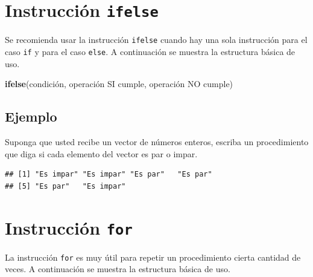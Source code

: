 \documentclass[10pt,]{krantz}
\makeatletter
\newenvironment{Shaded}{\begin{snugshade}}{\end{snugshade}}
\newcommand{\KeywordTok}[1]{\textcolor[rgb]{0.13,0.29,0.53}{\textbf{{#1}}}}
\newcommand{\DecValTok}[1]{\textcolor[rgb]{0.00,0.00,0.81}{{#1}}}
\newcommand{\StringTok}[1]{\textcolor[rgb]{0.31,0.60,0.02}{{#1}}}
\newcommand{\NormalTok}[1]{{#1}}
\newenvironment{kframe}{%
\medskip{}
\setlength{\fboxsep}{.8em}
 \def\at@end@of@kframe{}%
 \ifinner\ifhmode%
  \def\at@end@of@kframe{\end{minipage}}%
  \begin{minipage}{\columnwidth}%
 \fi\fi%
 \def\FrameCommand##1{\hskip\@totalleftmargin \hskip-\fboxsep
 \colorbox{shadecolor}{##1}\hskip-\fboxsep
     \hskip-\linewidth \hskip-\@totalleftmargin \hskip\columnwidth}%
 \MakeFramed {\advance\hsize-\width
   \@totalleftmargin\z@ \linewidth\hsize
   \@setminipage}}%
 {\par\unskip\endMakeFramed%
 \at@end@of@kframe}
\renewenvironment{Shaded}{\begin{kframe}}{\end{kframe}}
\makeatother
\begin{document}
\section{\texorpdfstring{Instrucción \texttt{ifelse}
}{Instrucción ifelse }}\label{instruccion-ifelse}

Se recomienda usar la instrucción \texttt{ifelse} cuando hay una sola
instrucción para el caso \texttt{if} y para el caso \texttt{else}. A
continuación se muestra la estructura básica de uso.

\begin{Shaded}
\begin{Highlighting}[]
\KeywordTok{ifelse}\NormalTok{(condición, operación SI cumple, operación NO cumple)}
\end{Highlighting}
\end{Shaded}

\subsection*{Ejemplo}\label{ejemplo-16}


Suponga que usted recibe un vector de números enteros, escriba un
procedimiento que diga si cada elemento del vector es par o impar.

\begin{Shaded}
\end{Shaded}

\begin{verbatim}
## [1] "Es impar" "Es impar" "Es par"   "Es par"  
## [5] "Es par"   "Es impar"
\end{verbatim}

\section{\texorpdfstring{Instrucción \texttt{for}
}{Instrucción for }}\label{instruccion-for}

La instrucción \texttt{for} es muy útil para repetir un procedimiento
cierta cantidad de veces. A continuación se muestra la estructura básica
de uso.
\end{document}
